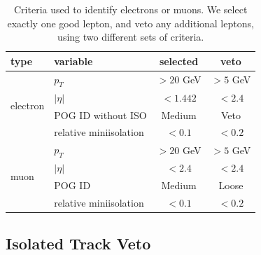 \begin{table}[htb]
\centering
\caption{Criteria used to identify electrons or muons. We select
  exactly one good lepton, and veto any additional leptons, using two
  different sets of criteria.}
\label{tab:stop:lepselections}
\begin{tabular}{ l | l | c | c }
\hline
type & variable & selected & veto \\ \hline
\multirow{4}{*}{electron} &    $p_T$ & $>20$ GeV & $>5$ GeV \\
 &   $|\eta|$ & $<1.442$ & $<2.4$ \\
 &   POG ID without ISO & Medium & Veto \\
 &   relative miniisolation & $<0.1$ & $<0.2$ \\
 \hline
 \multirow{4}{*}{muon} &    $p_T$ & $>20$ GeV & $>5$ GeV \\
 &   $|\eta|$ & $<2.4$ & $<2.4$ \\
 &   POG ID & Medium & Loose \\
 &   relative miniisolation & $<0.1$ & $<0.2$ \\
\hline
\end{tabular}
\end{table}

\subsection{Isolated Track Veto}
\label{ssec:stop:isotrackveto}

